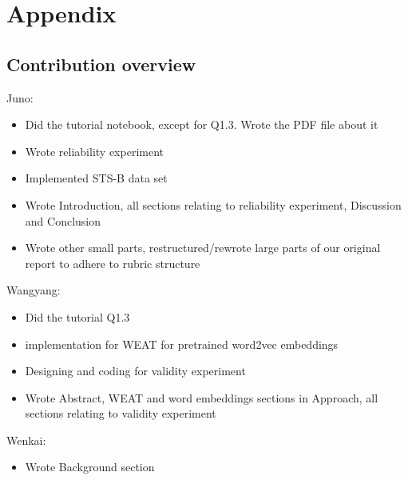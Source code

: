 \documentclass[11pt]{article}
\begin{document}



\section*{Appendix}
\subsection*{Contribution overview}
Juno: 
\begin{itemize}
    \item Did the tutorial notebook, except for Q1.3. Wrote the PDF file about it
    \item Wrote reliability experiment
    \item Implemented STS-B data set
    \item Wrote Introduction, all sections relating to reliability experiment, Discussion and Conclusion
    \item Wrote other small parts, restructured/rewrote large parts of our original report to adhere to rubric structure
\end{itemize}

Wangyang: 
\begin{itemize}
    \item Did the tutorial Q1.3
    \item implementation for WEAT for pretrained word2vec embeddings
    \item Designing and coding for validity experiment
    \item Wrote Abstract, WEAT and word embeddings sections in Approach, all sections relating to validity experiment
\end{itemize}

Wenkai:
\begin{itemize}
    \item Wrote Background section
\end{itemize}
\end{document}
